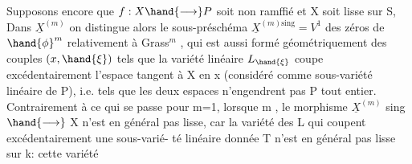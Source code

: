 Supposons encore que $f:X \hand{\longrightarrow} P$ soit non ramffié et X soit lisse sur
S, %
Dans $\underline{X}^{(m)}$  on distingue alors le sous-préschéma $\underline{X}^{(m)\mathrm{sing}} = V^1$
des zéros  de $\hand{\phi}^m$ relativement à Grass$^m$ , qui est aussi formé
géométriquement des couples $(x,\hand{\xi})$ tels que la variété linéaire $L_{\hand{\xi}}$
coupe excédentairement l'espace tangent à X en x (considéré comme
sous-variété linéaire de P), i.e. tels que les deux espaces n'engendrent
pas P tout entier. Contrairement à ce qui se passe pour m=1, lorsque
m , le morphisme $\underline{X}^{(m)}$ sing $\hand{\longrightarrow}$ X n'est en général pas
lisse, car la variété des L qui %
coupent excédentairement une sous-varié-%
té linéaire donnée T n'est en général pas lisse sur k: cette variété

